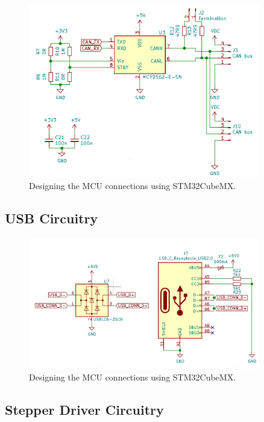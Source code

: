 \begin{figure}[H]
    \centering
    \includegraphics[width=0.9\textwidth]{obrazky/schem_can}
    \caption{Designing the MCU connections using STM32CubeMX.}
    \label{fig:schem_can}
\end{figure}

\subsection{USB Circuitry}
\label{subsec:usb_circuitry}

\begin{figure}[H]
    \centering
    \includegraphics[width=0.9\textwidth]{obrazky/schem_usb}
    \caption{Designing the MCU connections using STM32CubeMX.}
    \label{fig:schem_usb}
\end{figure}

\subsection{Stepper Driver Circuitry}
\label{subsec:stepper_circuitry}

